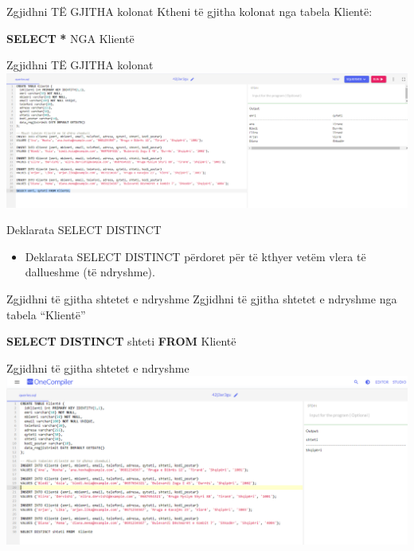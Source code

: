 \documentclass[
  ignorenonframetext,
]{beamer}
\newenvironment{Shaded}{\begin{snugshade}}{\end{snugshade}}
\newcommand{\KeywordTok}[1]{\textcolor[rgb]{0.13,0.29,0.53}{\textbf{#1}}}
\newcommand{\NormalTok}[1]{#1}
\newcommand{\OperatorTok}[1]{\textcolor[rgb]{0.81,0.36,0.00}{\textbf{#1}}}
\providecommand{\tightlist}{%
  \setlength{\itemsep}{0pt}\setlength{\parskip}{0pt}}
\begin{document}
\begin{frame}[fragile]{Zgjidhni TË GJITHA kolonat}
\label{zgjidhni-tuxeb-gjitha-kolonat-1}
Ktheni të gjitha kolonat nga tabela Klientë:

\begin{Shaded}
\begin{Highlighting}[]
\KeywordTok{SELECT} \OperatorTok{*}\NormalTok{ NGA Klientë}
\end{Highlighting}
\end{Shaded}
\end{frame}

\begin{frame}{Zgjidhni TË GJITHA kolonat}
\label{zgjidhni-tuxeb-gjitha-kolonat-2}
\includegraphics{./Figs/query2.png}
\end{frame}

\begin{frame}{Deklarata SELECT DISTINCT}
\label{deklarata-select-distinct}
\begin{itemize}
\tightlist
\item
  Deklarata SELECT DISTINCT përdoret për të kthyer vetëm vlera të
  dallueshme (të ndryshme).
\end{itemize}
\end{frame}

\begin{frame}[fragile]{Zgjidhni të gjitha shtetet e ndryshme}
\label{zgjidhni-tuxeb-gjitha-shtetet-e-ndryshme}
Zgjidhni të gjitha shtetet e ndryshme nga tabela ``Klientë''

\begin{Shaded}
\begin{Highlighting}[]
\KeywordTok{SELECT} \KeywordTok{DISTINCT}\NormalTok{ shteti }\KeywordTok{FROM}\NormalTok{  Klientë}
\end{Highlighting}
\end{Shaded}
\end{frame}

\begin{frame}{Zgjidhni të gjitha shtetet e ndryshme}
\label{zgjidhni-tuxeb-gjitha-shtetet-e-ndryshme-1}
\includegraphics{./Figs/query3.png}
\end{frame}
\end{document}
